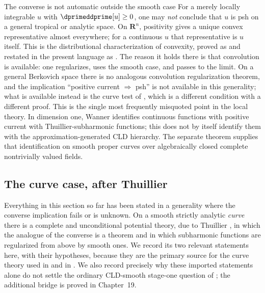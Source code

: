 \begin{warning}{The converse is not automatic outside the smooth case}
For a merely locally integrable $u$ with $\dprimeddprime[u]\ge0$, one may
\emph{not} conclude that $u$ is psh on a general tropical or analytic space.
On $\mathbf R^n$, positivity gives a unique convex representative almost
everywhere; for a continuous $u$ that representative is $u$ itself.  This
is the distributional characterization of convexity, proved as
 and restated in the present
language as .  The reason it holds there is
that convolution is available: one regularizes, uses the smooth case, and
passes to the limit.  On a general Berkovich space there is no analogous
convolution regularization theorem, and the implication ``positive current
$\Rightarrow$ psh'' is not available in this generality;
what is available instead is the curve test of ,
which is a different condition with a different proof.  This is the single
most frequently misquoted point in the local theory.  In dimension one,
Wanner identifies continuous functions with positive current with
Thuillier-subharmonic functions; this does not by itself identify them with
the approximation-generated CLD hierarchy.  The separate theorem
 supplies that
identification on smooth proper curves over algebraically closed complete
nontrivially valued fields.
\end{warning}

\subsection{The curve case, after Thuillier}
\label{sec:ch15-thuillier-curves}

Everything in this section so far has been stated in a generality where the
converse implication fails or is unknown.  On a smooth strictly analytic
\emph{curve} there is a complete and unconditional potential theory, due to
Thuillier \cite{Thu05}, in which the analogue of the converse is a theorem
and in which subharmonic functions are regularized from above by smooth ones.
We record its two relevant statements here, with their hypotheses, because
they are the primary source for the curve theory used in
 and in .  We also record
precisely why these imported statements alone do not settle the ordinary
CLD-smooth stage-one question of ; the additional
bridge is proved in Chapter~19.

